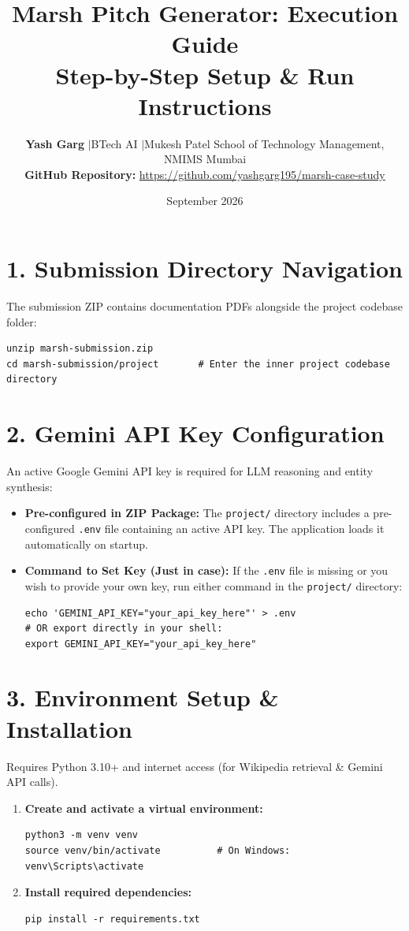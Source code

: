 \documentclass[11pt,a4paper]{article}
\title{\vspace{-1.4cm}\textbf{\Large Marsh Pitch Generator: Execution Guide}\\[0.2em]
\normalsize Step-by-Step Setup \& Run Instructions}
\author{
    \textbf{Yash Garg} \quad$\vert$\quad BTech AI \quad$\vert$\quad Mukesh Patel School of Technology Management, NMIMS Mumbai \\[0.2em]
    \textbf{GitHub Repository:} \href{https://github.com/yashgarg195/marsh-case-study}{\url{https://github.com/yashgarg195/marsh-case-study}}
}
\date{\vspace{-0.4cm}\small September 2026}
\begin{document}
\maketitle
\vspace{-0.6cm}

\section*{1. Submission Directory Navigation}
The submission ZIP contains documentation PDFs alongside the project codebase folder:
\begin{verbatim}
unzip marsh-submission.zip
cd marsh-submission/project       # Enter the inner project codebase directory
\end{verbatim}

\section*{2. Gemini API Key Configuration}
An active Google Gemini API key is required for LLM reasoning and entity synthesis:
\begin{itemize}
    \item \textbf{Pre-configured in ZIP Package:} The \texttt{project/} directory includes a pre-configured \texttt{.env} file containing an active API key. The application loads it automatically on startup.
    \item \textbf{Command to Set Key (Just in case):} If the \texttt{.env} file is missing or you wish to provide your own key, run either command in the \texttt{project/} directory:
\begin{verbatim}
echo 'GEMINI_API_KEY="your_api_key_here"' > .env
# OR export directly in your shell:
export GEMINI_API_KEY="your_api_key_here"
\end{verbatim}
\end{itemize}

\section*{3. Environment Setup \& Installation}
Requires Python 3.10+ and internet access (for Wikipedia retrieval \& Gemini API calls).
\begin{enumerate}
    \item \textbf{Create and activate a virtual environment:}
\begin{verbatim}
python3 -m venv venv
source venv/bin/activate          # On Windows: venv\Scripts\activate
\end{verbatim}
    \item \textbf{Install required dependencies:}
\begin{verbatim}
pip install -r requirements.txt
\end{verbatim}
\end{enumerate}
\end{document}
